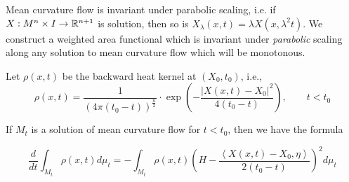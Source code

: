 Mean curvature flow is invariant under parabolic scaling, i.e.  if $ X : M^{n} \times I \to \mathbb{R}^{n+1} $ is solution, then so is $ X_{\lambda}(x,t) = \lambda X(x,\lambda^{2}t) $. We construct a weighted area functional which is invariant under \textit{parabolic} scaling along any solution to mean curvature flow which will be monotonous.

Let $ \rho(x,t) $ be the backward heat kernel at $ (X_{0},t_{0}) $, i.e.,   \[\rho(x,t) = \frac{1}{(4 \pi (t_{0}-t))^{ \frac{n}{2}} }\cdot \exp\left( - \frac{|X(x,t)-X_{0}|^{2}}{4(t_{0}-t)} \right), \qquad t<t_{0} \]
\begin{thm}
If $ M_{t} $ is a solution of mean curvature flow for $ t< t_{0} $, then we have the formula

    \[ \frac{d}{dt} \int_{M_{t}}\rho(x,t)d \mu_{t}  = - \int_{M_{t}}\rho(x,t)\left( H- \frac{\left< X(x,t)-X_{0}, \eta \right>}{2 (t_{0}-t)} \right)^{2}d \mu_{t}\] 

\end{thm}
